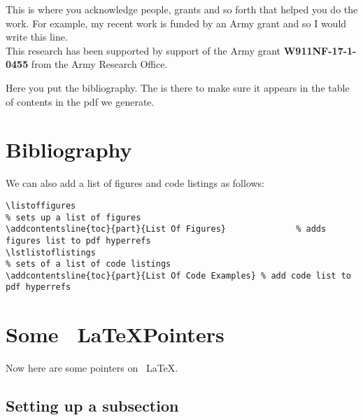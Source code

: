 \documentclass[11pt]{SelfArxOneColBMN}
\begin{document}
This is where you acknowledge people, grants and so forth
that helped you do the work.  For example,
my recent work is funded by an Army grant and so I would write
this line.\\

\noindent
This research has been supported by support of the Army grant {\bf W911NF-17-1-0455}
from the Army Research Office.

\noindent
Here you put the bibliography.  The 
is there to make sure it appears in the table of contents in the pdf
we generate.

\section*{Bibliography}

 

\noindent
We can also add a list of figures and code listings as follows:

\singlespacing 
{}
\begin{lstlisting}
\listoffigures                                                                   % sets up a list of figures
\addcontentsline{toc}{part}{List Of Figures}              % adds figures list to pdf hyperrefs
\lstlistoflistings                                                               % sets of a list of code listings
\addcontentsline{toc}{part}{List Of Code Examples} % add code list to pdf hyperrefs
\end{lstlisting}
\onehalfspacing
\lstset{fancyvrb=false}
%
\listoffigures                                 %
%
\lstlistoflistings                                 %

\section{Some ~\LaTeX Pointers}
\label{sec:'latexstuff}

Now here are some pointers on ~\LaTeX.

\subsection{Setting up a subsection}
\end{document}
